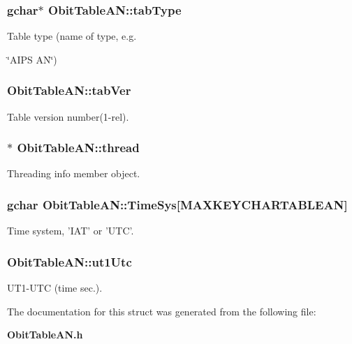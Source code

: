 \subsubsection{\setlength{\rightskip}{0pt plus 5cm}gchar$\ast$ {\bf Obit\-Table\-AN::tab\-Type}}\label{structObitTableAN_o12}


Table type (name of type, e.g. 

\char`\"{}AIPS AN\char`\"{}) 
\subsubsection{ {\bf Obit\-Table\-AN::tab\-Ver}}\label{structObitTableAN_o13}


Table version number(1-rel). 

\subsubsection{$\ast$ {\bf Obit\-Table\-AN::thread}}\label{structObitTableAN_o4}


Threading info member object. 

\subsubsection{\setlength{\rightskip}{0pt plus 5cm}gchar {\bf Obit\-Table\-AN::Time\-Sys}[MAXKEYCHARTABLEAN]}\label{structObitTableAN_o26}


Time system, 'IAT' or 'UTC'. 

\subsubsection{ {\bf Obit\-Table\-AN::ut1Utc}}\label{structObitTableAN_o24}


UT1-UTC (time sec.). 



The documentation for this struct was generated from the following file:\begin{CompactItemize}
\item 
{\bf Obit\-Table\-AN.h}\end{CompactItemize}
